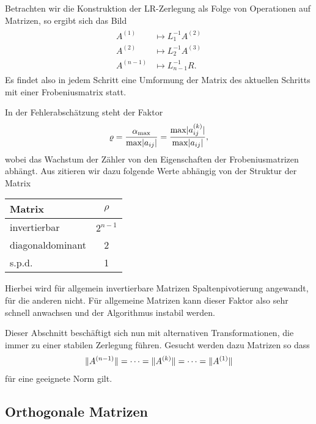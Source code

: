 \begin{intro}
  Betrachten wir die Konstruktion der LR-Zerlegung als Folge von
  Operationen auf Matrizen, so ergibt sich das Bild
  \begin{gather}
    \begin{split}
      A^{(1)} & \mapsto L_{1}^{-1} A^{(2)} \\
      A^{(2)} & \mapsto L_{2}^{-1} A^{(3)} \\
      A^{(n-1)} & \mapsto L_{n-1}^{-1} R.
    \end{split}
  \end{gather}
  Es findet also in jedem Schritt eine Umformung der Matrix des
  aktuellen Schritts mit einer Frobeniusmatrix statt.

  In der Fehlerabschätzung steht der Faktor
  \begin{gather}
    \varrho = \frac{\alpha_{\max}}{\max \lvert a_{ij}\rvert}
    = \frac{\max \lvert a^{(k)}_{ij}\rvert}{\max \lvert a_{ij}\rvert},
  \end{gather}
  wobei das Wachstum der Zähler von den Eigenschaften der
  Frobeniusmatrizen abhängt. Aus \cite{DeuflhardHohmann08} zitieren
  wir dazu folgende Werte abhängig von der Struktur der Matrix
  \begin{center}
    \begin{tabular}{l|c}
      Matrix & $\rho$\\\hline
      invertierbar & $2^{n-1}$ \\
      diagonaldominant & 2 \\
      s.p.d. & 1
    \end{tabular}
  \end{center}
  Hierbei wird für allgemein invertierbare Matrizen Spaltenpivotierung
  angewandt, für die anderen nicht. Für allgemeine Matrizen kann
  dieser Faktor also sehr schnell anwachsen und der Algorithmus
  instabil werden.

  Dieser Abschnitt beschäftigt sich nun mit alternativen
  Transformationen, die immer zu einer stabilen Zerlegung
  führen. Gesucht werden dazu Matrizen so dass
  \begin{gather}
    \lVert A^{(n-1)}\rVert = \dots = \lVert A^{(k)}\rVert = \dots = \lVert A^{(1)}\rVert
  \end{gather}
  für eine geeignete Norm gilt.
\end{intro}

\subsection{Orthogonale Matrizen}

